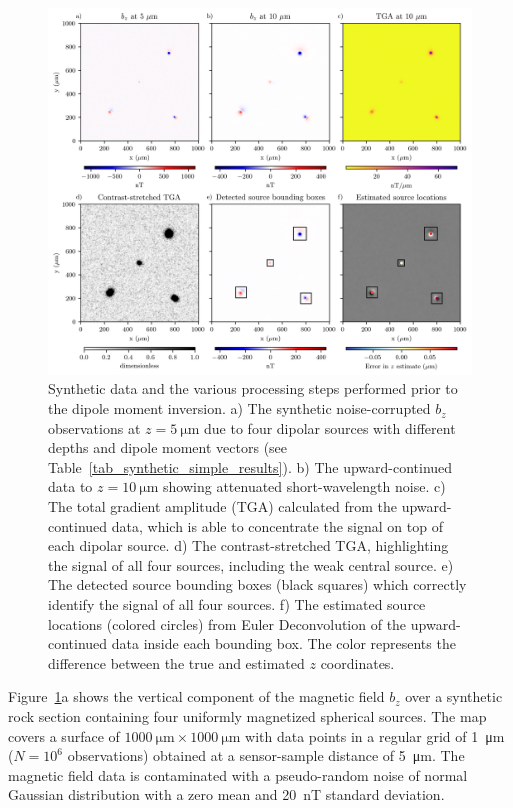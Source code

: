 \begin{figure}[!tb]
  \centering
  \includegraphics[width=1\linewidth]{figures/simple-synthetic-data.png}
  \caption{
    Synthetic data and the various processing steps performed prior to the
    dipole moment inversion. 
    a) The synthetic noise-corrupted $b_z$ observations at 
    $z = \qty{5}{\micro\meter}$ due to four dipolar sources with different
    depths and dipole moment vectors 
    (see Table~\ref{tab_synthetic_simple_results}).
    b) The upward-continued data to $z = \qty{10}{\micro\meter}$ showing
    attenuated short-wavelength noise.
    c) The total gradient amplitude (TGA) calculated from the 
    upward-continued data, which is able to concentrate the signal on top
    of each dipolar source. 
    d) The contrast-stretched TGA, highlighting the signal of all four
    sources, including the weak central source.
    e) The detected source bounding boxes (black squares) which correctly
    identify the signal of all four sources.
    f) The estimated source locations (colored circles) from Euler 
    Deconvolution of the upward-continued data inside each bounding box. 
    The color represents the difference between the true and estimated 
    $z$ coordinates.
  }
  \label{fig_synthetic_simple_data}
\end{figure}

Figure~\ref{fig_synthetic_simple_data}a shows the vertical component of the magnetic field
$b_z$ over a synthetic rock section containing four uniformly magnetized
spherical sources. The map covers a surface of $\qty{1000}{\um} \times
\qty{1000}{\um}$ with
data points in a regular grid of \qty{1}{\um} ($N = 10^6$ observations)
obtained at a sensor-sample distance of \qty{5}{\um}. The magnetic field data is
contaminated with a pseudo-random noise of normal Gaussian distribution with a
zero mean and \qty{20}{\nano\tesla} standard deviation.

